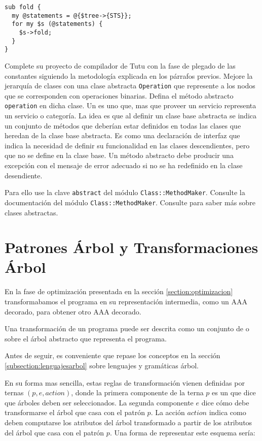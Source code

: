 \begin{verbatim}
sub fold {
  my @statements = @{$tree->{STS}};
  for my $s (@statements) {
    $s->fold;
  }
}
\end{verbatim}

Complete su proyecto de compilador de Tutu 
con la fase de plegado de las constantes siguiendo 
la metodología explicada 
en los párrafos previos. Mejore la jerarquía de 
clases con una clase abstracta \verb|Operation| que represente a los nodos
que se corresponden con operaciones binarias. Defina el método
abstracto \verb|operation| en dicha clase. 
Un  es uno que, mas que proveer un servicio 
representa un servicio o categoría.
La idea es que al definir un clase base abstracta se indica un conjunto de métodos
que deberían estar definidos en todas las clases que heredan de la clase base abstracta.
Es como una declaración de interfaz que indica la necesidad de definir su funcionalidad
en las clases descendientes, pero que no se define en la clase base.
Un método abstracto debe producir una excepción con el mensaje de error adecuado
si no se ha redefinido en la clase desendiente. 

Para ello use la clave 
\verb|abstract| del módulo \verb|Class::MethodMaker|. Consulte 
la documentación del módulo \verb|Class::MethodMaker|. Consulte 
para saber más sobre clases abstractas.

\section{Patrones Árbol y Transformaciones Árbol}
\label{section:patronesarbol}
En la fase de optimización presentada en la sección
\ref{section:optimizacion} transformabamos el programa 
en su representación intermedia, como un AAA
decorado, para obtener otro AAA decorado.

Una transformación de un programa puede ser descrita
como un conjunto de  
o 
sobre el árbol abstracto que representa el programa.

Antes de seguir, es conveniente que repase los conceptos
en la sección 
\ref{subsection:lenguajesarbol}
sobre lenguajes y gramáticas árbol.

En su forma mas sencilla, estas reglas de transformación
vienen definidas
por ternas $(p, e, action)$, donde la primera componente de la
terna $p$ es un  que dice que árboles
deben ser seleccionados. La segunda componente 
$e$ dice cómo debe transformarse el árbol que casa con el patrón
$p$. La acción $action$ indica como deben
computarse los atributos del árbol transformado
a partir de los atributos 
del árbol que casa con el patrón $p$.
Una forma de representar este esquema sería:

